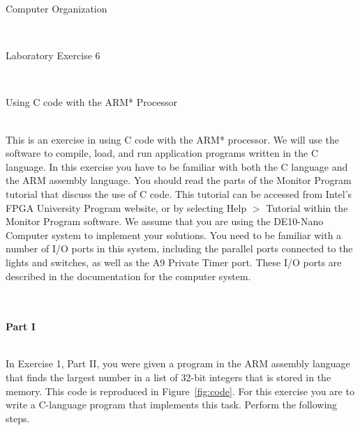 \documentclass[epsfig,10pt,fullpage]{article}
\newcommand{\LabNum}{6}
\begin{document}
\centerline{\huge Computer Organization}
~\\
\centerline{\huge Laboratory Exercise \LabNum}
~\\
\centerline{\large Using C code with the ARM* Processor}
~\\

\noindent
This is an exercise in using C code with the ARM* processor.  We will use 
the {\it \productNameMedTM{}} software to compile, load, and run application programs
written in the C language.  In this exercise you have to be familiar with both the C language 
and the ARM assembly language.  You should read the parts of the Monitor Program tutorial that 
discuss the use of C code.  This tutorial can be accessed from Intel's FPGA University Program 
website, or by selecting {\sf Help $>$ Tutorial} within the Monitor Program software.
We assume that you are using the DE10-Nano Computer system to implement your solutions. 
You need to be familiar with a number of I/O ports in this system, including the parallel ports 
connected to the lights and switches, as well as the A9 Private Timer port.
These I/O ports are described in the documentation for the computer system. 

~\\
~\\
\noindent
{\bf Part I}

~\\
\noindent
In Exercise 1, Part II, you were given a program in the ARM assembly language that finds the 
largest number in a list of 32-bit integers that is stored in the memory.  This code is 
reproduced in Figure~\ref{fig:code}. For this exercise you are to write a C-language program 
that implements this task.  Perform the following steps.
\end{document}
